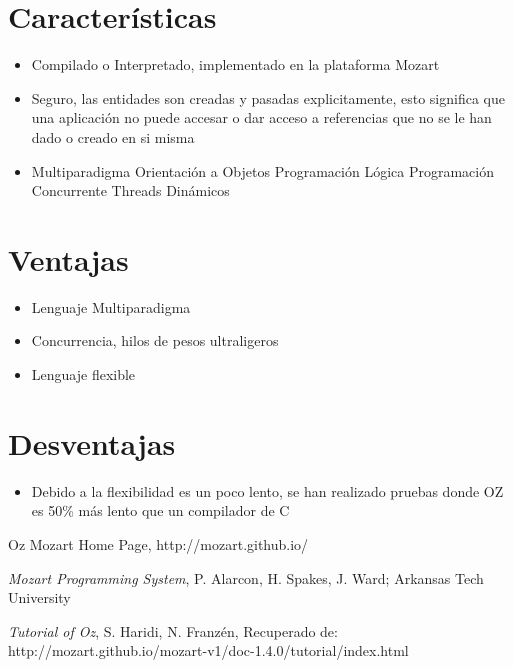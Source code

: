 \documentclass[10pt,journal,compsoc]{IEEEtran}
\begin{document}
\section{Caracter\'isticas}
\begin{itemize}
	\item Compilado o Interpretado, implementado en la plataforma Mozart
	\item Seguro, las entidades son creadas y pasadas explicitamente, esto significa que una aplicaci\'on no puede accesar o dar acceso a referencias que no se le han dado o creado en si misma
	\item Multiparadigma
		\subitem Orientaci\'on a Objetos
		\subitem Programaci\'on L\'ogica
		\subitem Programaci\'on Concurrente
			\subsubitem Threads Din\'amicos
\end{itemize}

\section{Ventajas}
\begin{itemize}
	\item Lenguaje Multiparadigma
	\item Concurrencia, hilos de pesos ultraligeros
	\item Lenguaje flexible
\end{itemize}

\section{Desventajas}
\begin{itemize}
	\item Debido a la flexibilidad es un poco lento, se han realizado pruebas donde OZ es 50\% m\'as lento que un compilador de C
\end{itemize}

\begin{thebibliography}{1}
	
	Oz Mozart Home Page, http://mozart.github.io/
	
	\emph{Mozart Programming System}, P. Alarcon, H. Spakes, J. Ward; Arkansas Tech University
	
	\emph{Tutorial of Oz}, S. Haridi, N. Franzén, Recuperado de:
	http://mozart.github.io/mozart-v1/doc-1.4.0/tutorial/index.html
\end{thebibliography}

\appendices
\onecolumn
\end{document}

